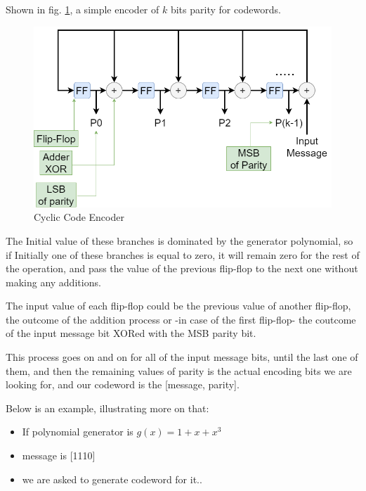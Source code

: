 \documentclass[a4paper,12pt]{report}
\begin{document}
{{{    Shown in fig. \ref{fig:encoder}, a simple encoder of $k$ bits parity for codewords.
    \begin{figure}[h!]
        \includegraphics[width=\linewidth]{Figures/cyclic_codes_encoding.png}
        \caption{Cyclic Code Encoder}
        \label{fig:encoder}
    \end{figure}

    The Initial value of these branches is dominated by the generator polynomial, so if Initially one
        of these branches is equal to zero, it will remain zero for the rest of the operation,
        and pass the value of the previous flip-flop to the next one without making any additions.

    The input value of each flip-flop could be the previous value of another flip-flop, the outcome
        of the addition process or -in case of the first flip-flop- the coutcome of the input message bit
        XORed with the MSB parity bit.
    
    This process goes on and on for all of the input message bits, until the last one of them,
        and then the remaining values of parity is the actual encoding bits we are looking for,
        and our codeword is the [message, parity].
    \newline

    Below is an example, illustrating more on that:
        \begin{itemize}
            \item If polynomial generator is $g(x) = 1 + x + x^3$
            \item message is [1110]
            \item we are asked to generate codeword for it..
        \end{itemize}

}}}
\end{document}
